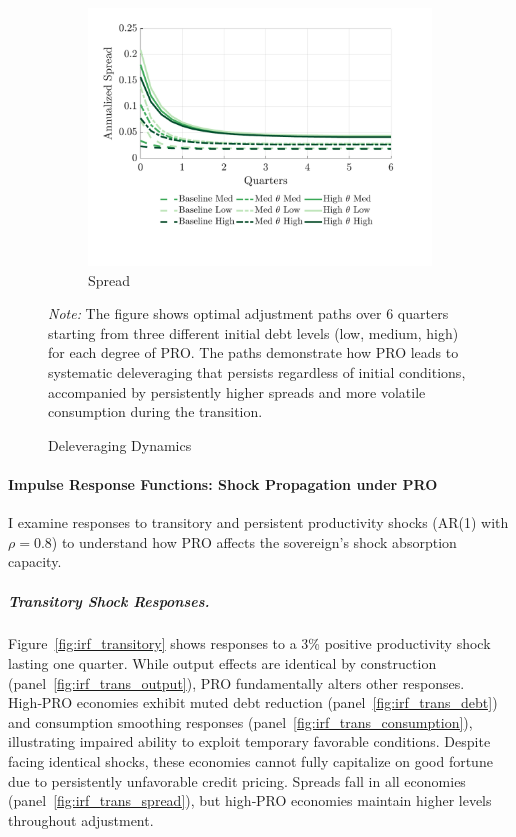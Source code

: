 \documentclass[12pt]{article}
\theoremstyle{plain}
\begin{document}
\begin{figure}[h]
\begin{subfigure}[b]{0.48\textwidth}
		\centering
		\includegraphics[width=\textwidth]{../../pro-default-model/results/comparison_figure_21.pdf}
		\caption{Spread}
		\label{fig:spread_path_delev}
	\end{subfigure}
	\caption{Deleveraging Dynamics}
	\label{fig:deleveraging_paths}
	\parbox{\linewidth}{\small\textit{Note:} The figure shows optimal adjustment paths over 6 quarters starting from three different initial debt levels (low, medium, high) for each degree of PRO. The paths demonstrate how PRO leads to systematic deleveraging that persists regardless of initial conditions, accompanied by persistently higher spreads and more volatile consumption during the transition.}
\end{figure}

\paragraph{Impulse Response Functions: Shock Propagation under PRO}

I examine responses to transitory and persistent productivity shocks (AR(1)
with $\rho = 0.8$) to understand how PRO affects the sovereign's shock
absorption capacity.

\subparagraph{Transitory Shock Responses.} Figure~\ref{fig:irf_transitory} shows responses to a 3\% positive productivity
shock lasting one quarter. While output effects are identical by construction
(panel~\ref{fig:irf_trans_output}), PRO fundamentally alters other responses.
High‑PRO economies exhibit muted debt reduction
(panel~\ref{fig:irf_trans_debt}) and consumption smoothing responses
(panel~\ref{fig:irf_trans_consumption}), illustrating impaired ability to
exploit temporary favorable conditions. Despite facing identical shocks, these
economies cannot fully capitalize on good fortune due to persistently
unfavorable credit pricing. Spreads fall in all economies
(panel~\ref{fig:irf_trans_spread}), but high‑PRO economies maintain higher
levels throughout adjustment.
\end{document}
